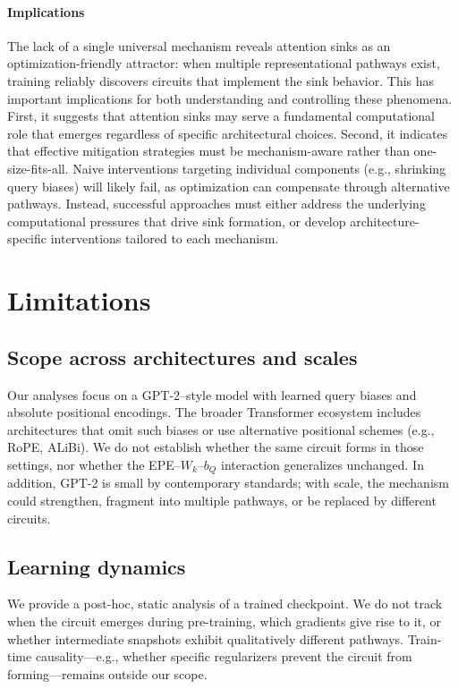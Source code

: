 \documentclass[11pt]{article}
\begin{document}
\paragraph{Implications}
The lack of a single universal mechanism reveals attention sinks as an optimization-friendly attractor: when multiple representational pathways exist, training reliably discovers circuits that implement the sink behavior. This has important implications for both understanding and controlling these phenomena. First, it suggests that attention sinks may serve a fundamental computational role that emerges regardless of specific architectural choices. Second, it indicates that effective mitigation strategies must be mechanism-aware rather than one-size-fits-all. Naive interventions targeting individual components (e.g., shrinking query biases) will likely fail, as optimization can compensate through alternative pathways. Instead, successful approaches must either address the underlying computational pressures that drive sink formation, or develop architecture-specific interventions tailored to each mechanism. 



\section{Limitations}

\subsection{Scope across architectures and scales}
Our analyses focus on a GPT-2–style model with learned query biases and absolute positional encodings. The broader Transformer ecosystem includes architectures that omit such biases or use alternative positional schemes (e.g., RoPE, ALiBi). We do not establish whether the same circuit forms in those settings, nor whether the EPE–$W_k$–$b_Q$ interaction generalizes unchanged. In addition, GPT-2 is small by contemporary standards; with scale, the mechanism could strengthen, fragment into multiple pathways, or be replaced by different circuits.

\subsection{Learning dynamics}
We provide a post-hoc, static analysis of a trained checkpoint. We do not track when the circuit emerges during pre-training, which gradients give rise to it, or whether intermediate snapshots exhibit qualitatively different pathways. Train-time causality—e.g., whether specific regularizers prevent the circuit from forming—remains outside our scope.
\end{document}
